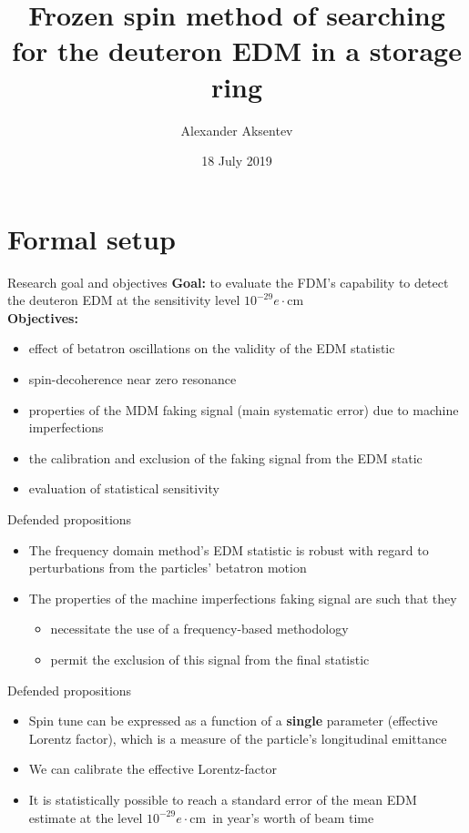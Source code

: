\documentclass[14pt]{beamer}
\title[Thesis presentation]{Frozen spin method of searching for the deuteron EDM in a storage ring}
\author[A. Aksentev]{Alexander Aksentev \inst{1,2}}
\institute[NRNU MEPhI]{
	\inst{1} Forschungszentrum J\"ulich \and%
	\inst{2} NRNU ``MEPhI''
}
\date{18 July 2019}
\renewcommand{\ecm}{$e\cdot$cm}
\begin{document}
	\maketitle
	
	
\section{Formal setup}
\begin{frame}{Research goal and objectives}
	\textbf{Goal:} to evaluate the FDM's capability to detect the deuteron EDM at the sensitivity level $10^{-29}$\ecm \\
	\pause
	\textbf{Objectives:}
	\begin{itemize}
		\item effect of betatron oscillations on the validity of the EDM statistic
		\item spin-decoherence near zero resonance
		\item properties of the MDM faking signal (main systematic error) due to machine imperfections
		\item the calibration and exclusion of the faking signal from the EDM static
		\item evaluation of statistical sensitivity
	\end{itemize}
\end{frame}

\begin{frame}{Defended propositions}
	\begin{itemize}[<+->]
		\item The frequency domain method's EDM statistic is robust with regard to perturbations from the particles' betatron motion
		\item The properties of the machine imperfections faking signal are such that they
		\begin{itemize}[<.->]
			\item necessitate the use of a frequency-based methodology 
			\item permit the exclusion of this signal from the final statistic
		\end{itemize}
	\end{itemize}
\end{frame}
\begin{frame}{Defended propositions}
	\begin{itemize}[<+->]
		\item Spin tune can be expressed as a function of a \textbf{single} parameter (effective Lorentz factor), which is a measure of the particle's longitudinal emittance
		\item We can calibrate the effective Lorentz-factor
		\item It is statistically possible to reach a standard error of the mean EDM estimate at the level $10^{-29}$\ecm~in year's worth of beam time
	\end{itemize}
\end{frame}
\end{document}
